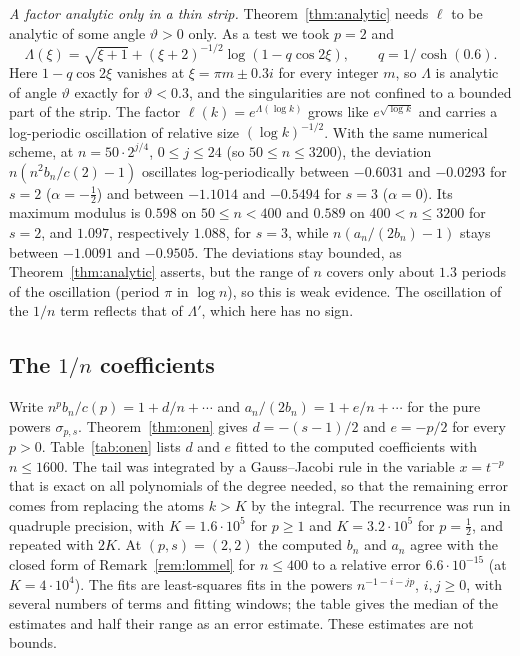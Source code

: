 \emph{A factor analytic only in a thin strip.} Theorem~\ref{thm:analytic} needs $\ell$ to be analytic of some angle
$\vartheta>0$ only. As a test we took $p=2$ and
\[
  \Lambda(\xi)=\sqrt{\xi+1}+(\xi+2)^{-1/2}\log(1-q\cos2\xi),\qquad q=1/\cosh(0.6).
\]
Here $1-q\cos2\xi$ vanishes at $\xi=\pi m\pm0.3i$ for every integer $m$, so $\Lambda$ is analytic of angle $\vartheta$
exactly for $\vartheta<0.3$, and the singularities are not confined to a bounded part of the strip. The factor
$\ell(k)=e^{\Lambda(\log k)}$ grows like $e^{\sqrt{\log k}}$ and carries a log-periodic oscillation of relative size
$(\log k)^{-1/2}$. With the same numerical scheme, at $n=50\cdot2^{j/4}$, $0\le j\le24$ (so $50\le n\le3200$), the
deviation $n(n^2b_n/c(2)-1)$ oscillates log-periodically between $-0.6031$ and $-0.0293$ for $s=2$
($\alpha=-\frac12$) and between $-1.1014$ and $-0.5494$ for $s=3$ ($\alpha=0$). Its maximum modulus is $0.598$ on
$50\le n<400$ and $0.589$ on $400<n\le3200$ for $s=2$, and $1.097$, respectively $1.088$, for $s=3$, while
$n(a_n/(2b_n)-1)$ stays between $-1.0091$ and $-0.9505$. The deviations stay bounded, as
Theorem~\ref{thm:analytic} asserts, but the range of $n$ covers only about $1.3$ periods of the oscillation (period $\pi$
in $\log n$), so this is weak evidence. The oscillation of the $1/n$ term reflects that of $\Lambda'$, which here has
no sign.

\subsection{\texorpdfstring{The $1/n$ coefficients}{The 1/n coefficients}}
Write $n^pb_n/c(p)=1+d/n+\cdots$ and $a_n/(2b_n)=1+e/n+\cdots$ for the pure powers $\sigma_{p,s}$.
Theorem~\ref{thm:onen} gives $d=-(s-1)/2$ and $e=-p/2$ for every $p>0$. Table~\ref{tab:onen} lists $d$ and $e$ fitted
to the computed coefficients with $n\le1600$. The tail was
integrated by a Gauss--Jacobi rule in the variable $x=t^{-p}$ that is exact on all polynomials of the degree needed, so
that the remaining error comes from replacing the atoms $k>K$ by the integral. The recurrence was run in quadruple
precision, with $K=1.6\cdot10^5$ for $p\ge1$ and $K=3.2\cdot10^5$ for $p=\frac12$, and repeated with $2K$. At
$(p,s)=(2,2)$ the computed $b_n$ and $a_n$ agree with the closed form of Remark~\ref{rem:lommel} for $n\le400$ to a
relative error $6.6\cdot10^{-15}$ (at $K=4\cdot10^4$). The fits are least-squares fits in the powers
$n^{-1-i-jp}$, $i,j\ge0$, with several numbers of terms and fitting windows; the table gives the median of the estimates
and half their range as an error estimate. These estimates are not bounds.


